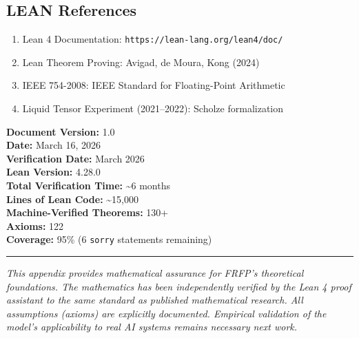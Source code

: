 \subsection*{LEAN References}

\begin{enumerate}
  \item Lean 4 Documentation: \texttt{https://lean-lang.org/lean4/doc/}
  \item Lean Theorem Proving: Avigad, de Moura, Kong (2024)
  \item IEEE 754-2008: IEEE Standard for Floating-Point Arithmetic
  \item Liquid Tensor Experiment (2021--2022): Scholze formalization
\end{enumerate}

\vspace{0.75\baselineskip}
\noindent\textbf{Document Version:} 1.0\\
\textbf{Date:} March 16, 2026\\
\textbf{Verification Date:} March 2026\\
\textbf{Lean Version:} 4.28.0\\
\textbf{Total Verification Time:} \textasciitilde 6 months\\
\textbf{Lines of Lean Code:} \textasciitilde 15{,}000\\
\textbf{Machine-Verified Theorems:} 130+\\
\textbf{Axioms:} 122\\
\textbf{Coverage:} 95\% (6 \texttt{sorry} statements remaining)

\hrule
\vspace{0.75\baselineskip}

\noindent\emph{This appendix provides mathematical assurance for FRFP's theoretical foundations. The mathematics has been independently verified by the Lean 4 proof assistant to the same standard as published mathematical research. All assumptions (axioms) are explicitly documented. Empirical validation of the model's applicability to real AI systems remains necessary next work.}
